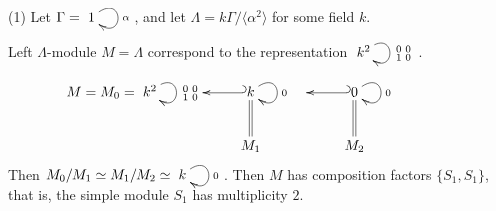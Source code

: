 \begin{exam}
(1) Let $\Gamma = \xymatrix{1\ar@(ur,dr)^\alpha }$, and let $\Lambda =
k\Gamma/\langle \alpha^2\rangle$ for some field $k$. 

Left $\Lambda$-module $M = \Lambda$ correspond to the representation
$\xymatrix{k^2\ar@(ur,dr)^{\begin{smallmatrix} 0 & 0\\ 1 &
      0\end{smallmatrix}}}$. 

\[M = M_0 = \xymatrix{k^2\ar@(ur,dr)^{\begin{smallmatrix} 0 & 0\\ 1 &
        0\end{smallmatrix}} & & \ar@{_(->}[l] k\ar@(ur,dr)^{0} & &
    \ar@{_(->}[l] 0\ar@(ur,dr)^{0}\\
& &  M_1\ar@{=}[u] & &  M_2\ar@{=}[u] & &}\] 
Then $M_0/M_1 \simeq M_1/M_2 \simeq \xymatrix{k\ar@(ur,dr)^{0}}$.
Then $M$ has composition factors $\{S_1,S_1\}$, that is, the simple
module $S_1$ has multiplicity $2$. 


\end{exam}
